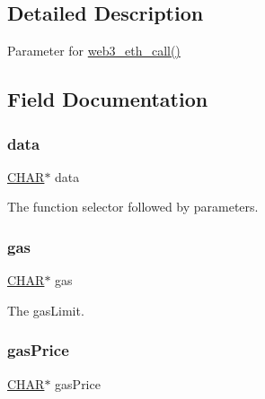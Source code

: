 \subsection{Detailed Description}
Parameter for \mbox{\hyperlink{web3intf_8c_a7116548e501f02dd2d2cda471a1dae4f}{web3\+\_\+eth\+\_\+call()}} 

\subsection{Field Documentation}
\mbox{\label{struct_t_param__eth__call_a5e87342548dad4478a45acbbdfb7a9a5}} 
\subsubsection{\texorpdfstring{data}{data}}
{\footnotesize\ttfamily \mbox{\hyperlink{boattypes_8h_aebb9e13210d88d43e32e735ada43a425}{C\+H\+AR}}$\ast$ data}



The function selector followed by parameters. 

\mbox{\label{struct_t_param__eth__call_a25d821287fd941a396a9315dedd656e2}} 
\subsubsection{\texorpdfstring{gas}{gas}}
{\footnotesize\ttfamily \mbox{\hyperlink{boattypes_8h_aebb9e13210d88d43e32e735ada43a425}{C\+H\+AR}}$\ast$ gas}



The gas\+Limit. 

\mbox{\label{struct_t_param__eth__call_aa74af65d0e7285f25ccd9e7884194a93}} 
\subsubsection{\texorpdfstring{gas\+Price}{gasPrice}}
{\footnotesize\ttfamily \mbox{\hyperlink{boattypes_8h_aebb9e13210d88d43e32e735ada43a425}{C\+H\+AR}}$\ast$ gas\+Price}



